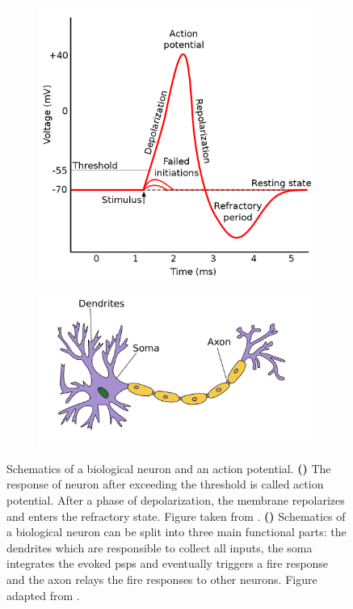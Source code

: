 \begin{figure}
	\begin{subfigure}{0.5\textwidth}
		\centering
		\caption{}
		\includegraphics[width=0.8\linewidth, valign=t]{figures/action_potential.png}
		\label{actionpotential}
	\end{subfigure}
	\begin{subfigure}{0.5\textwidth}
		\centering
		\caption{}
		\vspace{0.5cm}
		\includegraphics[width=\linewidth, valign=t]{figures/Neuron.pdf}
		\vspace{1.5cm}	
		\label{biosynapse}
	\end{subfigure}
	\caption[Schematics of an action potential and a biological neuron]{Schematics of a biological neuron and an action potential. \textbf{()} The response of neuron after exceeding the threshold is called action potential. After a phase of depolarization, the membrane repolarizes and enters the refractory state. Figure taken from \citealp{picture_actionpotential}. \textbf{()} Schematics of a biological neuron can be split into three main functional parts: the dendrites which are responsible to collect all inputs, the soma integrates the evoked \glspl{psp} and eventually triggers a fire response and the axon relays the fire responses to other neurons. Figure adapted from \citealp{picture_neuron}.}
	\label{biologicalneuron}
	
\end{figure}

